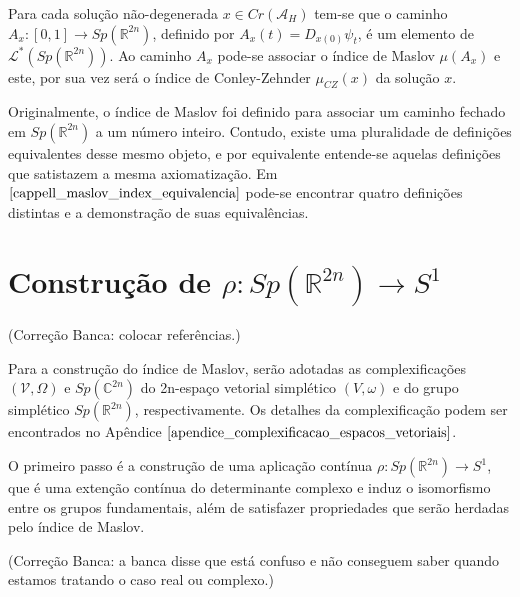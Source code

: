 \documentclass[12pt]{book}
\newcommand{\caminhosespeciais}[1]{\mathcal{L}^{*}(#1)}
\newcommand{\circulo}{S^{1}}
\newcommand{\complexificado}[1]{\mathcal{#1}}
\newcommand{\complexo}[1]{\mathbb{C}^{#1}}
\newcommand{\funcionalH}{\mathcal{A}_{H}}
\newcommand{\gruposimpletico}[1]{Sp(#1)}
\newcommand{\iconley}[1]{\iconleyabrev(#1)}
\newcommand{\iconleyabrev}{\mu_{CZ}}
\newcommand{\intervalo}{[0,1]}
\newcommand{\pontoscriticos}[1]{\textit{Cr}(#1)}
\newcommand{\real}[1]{\mathbb{R}^{#1}}
\newcommand{\alerta}[1]{{\color{red}#1}}
\newcommand{\correcaobanca}[1]{\alerta{(Correção Banca: #1)}}
\begin{document}
	Para cada solução não-degenerada $x \in \pontoscriticos{\funcionalH}$ tem-se que o caminho $A_{x}:\intervalo \to \gruposimpletico{\real{2n}}$, definido por $A_{x}(t) = D_{x(0)}\psi_{t} $, é um elemento de $\caminhosespeciais{\gruposimpletico{\real{2n}}}$. Ao caminho $A_{x}$ pode-se associar o índice de Maslov $\mu(A_{x})$ e este, por sua vez será o índice de Conley-Zehnder $\iconley{x}$ da solução $x$.
	
	Originalmente, o índice de Maslov foi definido para associar um caminho fechado em $\gruposimpletico{\real{2n}} $ a um número inteiro. Contudo, existe uma pluralidade de definições equivalentes desse mesmo objeto, e por equivalente entende-se aquelas definições que satistazem a mesma axiomatização. Em $\cite{cappell_maslov_index_equivalencia}$ pode-se encontrar quatro definições distintas e a demonstração de suas equivalências.
	
	
	\section{Construção de $\rho: \gruposimpletico{\real{2n}} \to \circulo$}
	
	\correcaobanca{colocar referências.}
	
	Para a construção do índice de Maslov, serão adotadas as complexificações $(\complexificado{V}, \Omega) $ e $\gruposimpletico{\complexo{2n}}$ do 2n-espaço vetorial simplético $(V, \omega)$ e do grupo simplético $\gruposimpletico{\real{2n}}$, respectivamente. Os detalhes da complexificação podem ser encontrados no Apêndice $\ref{apendice_complexificacao_espacos_vetoriais}$. 
	
	O primeiro passo é a construção de uma aplicação contínua $\rho: \gruposimpletico{\real{2n}}\to \circulo$, que é uma extenção contínua do determinante complexo e induz o isomorfismo entre os grupos fundamentais, além de satisfazer propriedades que serão herdadas pelo índice de Maslov.
	
	\correcaobanca{a banca disse que está confuso e não conseguem saber quando estamos tratando o caso real ou complexo.}
	
\end{document}
